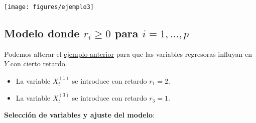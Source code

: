 \documentclass[
  12pt,
  a4paper]{article}
\newenvironment{Shaded}{\begin{snugshade}}{\end{snugshade}}
\newcommand{\DecValTok}[1]{\textcolor[rgb]{0.00,0.00,0.81}{#1}}
\newcommand{\FloatTok}[1]{\textcolor[rgb]{0.00,0.00,0.81}{#1}}
\newcommand{\FunctionTok}[1]{\textcolor[rgb]{0.00,0.00,0.00}{#1}}
\newcommand{\NormalTok}[1]{#1}
\newcommand{\OtherTok}[1]{\textcolor[rgb]{0.56,0.35,0.01}{#1}}
\newcommand{\SpecialCharTok}[1]{\textcolor[rgb]{0.00,0.00,0.00}{#1}}
\providecommand{\tightlist}{%
  \setlength{\itemsep}{0pt}\setlength{\parskip}{0pt}}
\begin{document}
\begin{center}\texttt{[image: figures/ejemplo3]} \end{center}

\hypertarget{modelo-donde-r_i-geq-0-para-i1...p}{%
\subsection{\texorpdfstring{Modelo donde \(r_i \geq 0\) para
\(i=1,...,p\)}{Modelo donde r\_i \textbackslash geq 0 para i=1,...,p}}\label{modelo-donde-r_i-geq-0-para-i1...p}}

Podemos alterar el \protect\hyperlink{ejemplo3}{ejemplo anterior} para
que las variables regresoras influyan en \(Y\) con cierto retardo.

\begin{itemize}
\tightlist
\item
  La variable \(X_t^{(1)}\) se introduce con retardo \(r_1=2\).
\item
  La variable \(X_t^{(3)}\) se introduce con retardo \(r_3=1\).
\end{itemize}

\begin{Shaded}
\end{Shaded}

\textbf{Selección de variables y ajuste del modelo}:
\end{document}
